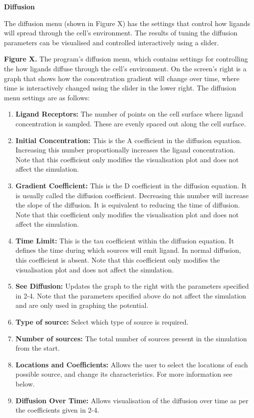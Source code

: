 \documentclass[12pt,a4paper]{report}
\begin{document}
{\bfseries Diffusion}

The diffusion menu (shown in Figure X) has the settings that control how 
ligands will spread through the cell's environment. The results of 
tuning the diffusion parameters can be visualised and controlled 
interactively using a slider.

\begin{figure}[H]
\centering
\end{figure}


{\bfseries Figure X. }The program's diffusion menu, which contains 
settings for controlling the how ligands diffuse through the cell's 
environment. On the screen's right is a graph that shows how the 
concentration gradient will change over time, where time is 
interactively changed using the slider in the lower right. The diffusion 
menu settings are as follows:

\begin{enumerate}
\item {\bfseries Ligand Receptors:} The number of points on the cell 
surface where ligand concentration is sampled. These are evenly spaced 
out along the cell surface.
\item {\bfseries Initial Concentration:} This is the A coefficient in the 
diffusion equation. Increasing this number proportionally increases the 
ligand concentration. Note that this coefficient only modifies the 
visualisation plot and does not affect the simulation.
\item {\bfseries Gradient Coefficient: }This is the D coefficient in the 
diffusion equation. It is usually called the diffusion coefficient. 
Decreasing this number will increase the slope of the diffusion. It is 
equivalent to reducing the time of diffusion. Note that this coefficient 
only modifies the visualisation plot and does not affect the simulation.
\item {\bfseries Time Limit:} This is the tau coefficient within the 
diffusion equation. It defines the time during which sources will emit 
ligand. In normal diffusion, this coefficient is absent. Note that this 
coefficient only modifies the visualisation plot and does not affect the 
simulation.
\item {\bfseries See Diffusion: }Updates the graph to the right with the 
parameters specified in 2-4. Note that the parameters specified above do 
not affect the simulation and are only used in graphing the potential.
\item {\bfseries Type of source:} Select which type of source is 
required.
\item {\bfseries Number of sources: }The total number of sources present 
in the simulation from the start.
\item {\bfseries Locations and Coefficients: }Allows the user to select 
the locations of each possible source, and change its characteristics. 
For more information see below.
\item {\bfseries Diffusion Over Time:} Allows visualisation of the 
diffusion over time as per the coefficients given in 2-4.
\setcounter{numberedCntC}{\theenumi}
\end{enumerate}
\end{document}
